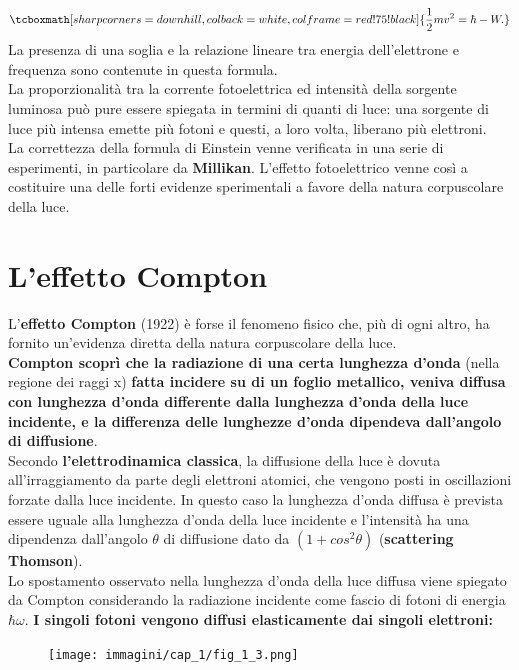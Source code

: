 	\begin{equation}
		\tcboxmath[sharp corners=downhill ,colback=white,colframe=red!75!black]{
			\frac{1}{2}m v^2= \hbar - W.
			}
	\end{equation}
La presenza di una soglia e la relazione lineare tra energia dell'elettrone e frequenza sono contenute in questa formula.\\
La proporzionalità tra la corrente fotoelettrica ed intensità della sorgente luminosa può pure essere spiegata in termini di quanti di luce: una sorgente di luce più intensa emette più fotoni e questi, a loro volta, liberano più elettroni.\\
La correttezza della formula di Einstein venne verificata in una serie di esperimenti, in particolare da \textbf{Millikan}. L'effetto fotoelettrico venne così a costituire una delle forti evidenze sperimentali a favore della natura corpuscolare della luce.
\section{L'effetto Compton}
L'\textbf{effetto Compton} (1922) è forse il fenomeno fisico che, più di ogni altro, ha fornito un'evidenza diretta della natura corpuscolare della luce.\\
\textbf{Compton scoprì che la radiazione di una certa lunghezza d'onda} (nella regione dei raggi x) \textbf{fatta incidere su di un foglio metallico, veniva diffusa con lunghezza d'onda differente dalla lunghezza d'onda della luce incidente, e la differenza delle lunghezze d'onda dipendeva dall'angolo di diffusione}.\\

Secondo \textbf{l'elettrodinamica classica}, la diffusione della luce è dovuta all'irraggiamento da parte degli elettroni atomici, che vengono posti in oscillazioni forzate dalla luce incidente. In questo caso la lunghezza d'onda diffusa è prevista essere uguale alla lunghezza d'onda della luce incidente e l'intensità ha una dipendenza dall'angolo $\theta$ di diffusione dato da $(1+cos^2 \theta)$ (\textbf{scattering Thomson}).\\

Lo spostamento osservato nella lunghezza d'onda della luce diffusa viene spiegato da Compton considerando la radiazione incidente come fascio di fotoni di energia $\hbar \omega$. \textbf{I singoli fotoni vengono diffusi elasticamente dai singoli elettroni:}
	\begin{figure}[!htbp]
		\begin{center}
			\texttt{[image: immagini/cap\_1/fig\_1\_3.png]}
		\end{center}
	\end{figure}
	
